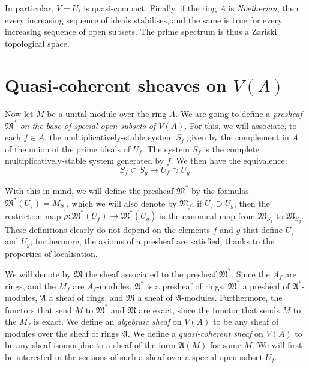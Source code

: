 \documentclass[british]{article}
\newcommand{\oldpage}[1]{\marginpar{\footnotesize$\Big\vert$ \textit{p.~#1}}}
\begin{document}
In particular, \(V=U_i\) is quasi-compact. Finally, if the ring \(A\) is
\emph{Noetherian}, then every increasing sequence of ideals stabilises,
and the same is true for every increasing sequence of open subsets.
\oldpage{1-04} The prime spectrum is thus a Zariski topological space.

\section{\texorpdfstring{Quasi-coherent sheaves on
\(V(A)\)}{Quasi-coherent sheaves on V(A)}}\label{section-3}

Now let \(M\) be a unital module over the ring \(A\). We are going to
define a \emph{presheaf \(\mathfrak{M}^*\) on the base of special open
subsets of \(V(A)\)}. For this, we will associate, to each \(f\in A\),
the multiplicatively-stable system \(S_f\) given by the complement in
\(A\) of the union of the prime ideals of \(U_f\). The system \(S_f\) is
the complete multiplicatively-stable system generated by \(f\). We then
have the equivalence: \[
  S_f \subset S_g \mapsto U_f \supset U_g.
\]

With this in mind, we will define the presheaf \(\mathfrak{M}^*\) by the
formulas \(\mathfrak{M}^*(U_f)=M_{S_f}\), which we will also denote by
\(\mathfrak{M}_f\); if \(U_f\supset U_g\), then the restriction map
\(\rho\colon\mathfrak{M}^*(U_f)\to\mathfrak{M}^*(U_g)\) is the canonical
map from \(\mathfrak{M}_{S_f}\) to \(\mathfrak{M}_{S_g}\). These
definitions clearly do not depend on the elements \(f\) and \(g\) that
define \(U_f\) and \(U_g\); furthermore, the axioms of a presheaf are
satisfied, thanks to the properties of localisation.

We will denote by \(\mathfrak{M}\) the sheaf associated to the presheaf
\(\mathfrak{M}^*\). Since the \(A_f\) are rings, and the \(M_f\) are
\(A_f\)-modules, \(\mathfrak{A}^*\) is a presheaf of rings,
\(\mathfrak{M}^*\) a presheaf of \(\mathfrak{A}^*\)-modules,
\(\mathfrak{A}\) a sheaf of rings, and \(\mathfrak{M}\) a sheaf of
\(\mathfrak{A}\)-modules. Furthermore, the functors that send \(M\) to
\(\mathfrak{M}^*\) and \(\mathfrak{M}\) are exact, since the functor
that sends \(M\) to the \(M_f\) is exact. We define an \emph{algebraic
sheaf} on \(V(A)\) to be any sheaf of modules over the sheaf of rings
\(\mathfrak{A}\). We define a \emph{quasi-coherent sheaf} on \(V(A)\) to
be any sheaf isomorphic to a sheaf of the form \(\mathfrak{A}(M)\) for
some \(M\). We will first be interested in the sections of such a sheaf
over a special open subset \(U_f\).
\end{document}
